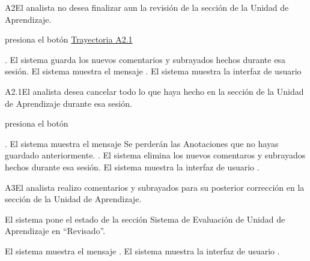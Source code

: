 	
\begin{UCtrayectoriaA}{A2}{El analista no desea finalizar aun la revisión de la sección de la Unidad de Aprendizaje.}

    \hypertarget{SP2-CU9-A2}{\UCpaso[\UCactor] presiona el botón  \hyperlink{SP2-CU9-A2.1}{Trayectoria A2.1}}. 
    \UCpaso El sistema guarda los nuevos comentarios y subrayados hechos durante esa sesión.
    \UCpaso El sistema muestra el mensaje .
    \UCpaso El sistema muestra la interfaz de usuario 
\end{UCtrayectoriaA}

\begin{UCtrayectoriaA}{A2.1}{El analista desea cancelar todo lo que haya hecho en la sección de la Unidad de Aprendizaje durante esa sesión.}

	\hypertarget{SP2-CU9-A2.1}{\UCpaso[\UCactor] presiona el botón }. 
    \UCpaso El sistema muestra el mensaje 
Se perderán las Anotaciones que no hayas guardado anteriormente. .
    \UCpaso El sistema elimina los nuevos comentaros y subrayados hechos durante esa sesión.
    \UCpaso El sistema muestra la interfaz de usuario .
\end{UCtrayectoriaA}

	
\begin{UCtrayectoriaA}{A3}{El analista realizo comentarios y subrayados para su posterior corrección en la sección de la Unidad de Aprendizaje.} 

	\hypertarget{SP2-CU9-A3}{\UCpaso El sistema pone el estado de la sección Sistema de Evaluación de Unidad de Aprendizaje en “Revisado”.}
    \UCpaso El sistema muestra el mensaje .
    \UCpaso El sistema muestra la interfaz de usuario .
\end{UCtrayectoriaA}